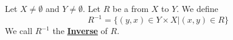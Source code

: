 \newcommand{\RelationInverse}[0]{\textbf{\hyperref[def:RelationInverse]{Inverse}}\xspace}
\begin{df}
\label{def:RelationInverse}

\rm
    Let $X\neq \emptyset$ and
    $Y \neq \emptyset$. 
    Let $R$ be a 
    \Relation
    from $X$ to $Y$. 
    We define 
    \begin{equation*}
    R^{-1} = \{(y,x) \in Y\times X | (x,y) \in R\}
    \end{equation*}
    We call $R^{-1}$ the 
    \RelationInverse
    of $R$. 
\end{df}
